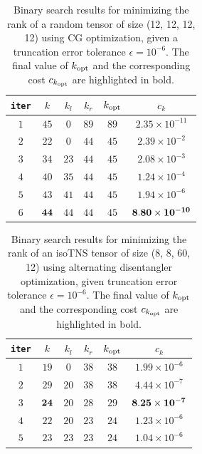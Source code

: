 \documentclass[pdflatex,sn-mathphys-num]{sn-jnl}
\begin{document}
\begin{table}
    \centering
    \begin{tabular}{cccccc}
    \toprule
     \texttt{iter} & $k$ & $k_l$ & $k_r$ & $k_{\rm opt}$ & $c_k$ \\
    \midrule
    $1$ & $45$ & $0$ & $89$ & $89$ & $2.35 \times 10^{-11}$ \\
    $2$ & $22$ & $0$ & $44$ & $45$ & $2.39 \times 10^{-2}$ \\
    $3$ & $34$ & $23$ & $44$ & $45$ & $2.08 \times 10^{-3}$\\
    $4$ & $40$ & $35$ & $44$ & $45$ & $1.24 \times 10^{-4}$ \\
    $5$ & $43$ & $41$ & $44$ & $45$ & $1.94 \times 10^{-6}$ \\
    $6$ & $\bf{44}$ & $44$ & $44$ & $45$ & 
    $\bf{8.80 \times 10^{-10}}$ \\
    \bottomrule
    \end{tabular}
\caption{Binary search results for minimizing the rank of a random tensor of size (12, 12, 12, 12) using CG optimization, given a truncation error tolerance $\epsilon = 10^{-6}$. The final value of $k_{\rm opt}$ and the corresponding cost $c_{k_{\rm opt}}$ are highlighted in bold.}
\label{table:binarysearch_randn}
\end{table}

\begin{table}
    \centering
    \begin{tabular}{cccccc}
    \toprule
     \texttt{iter} & $k$ & $k_l$ & $k_r$ & $k_{\rm opt}$ & $c_k$ \\
    \midrule
    $1$ & $19$ & $0$ & $38$ & $38$ & $1.99 \times 10^{-6}$ \\
    $2$ & $29$ & $20$ & $38$ & $38$ & $4.44 \times 10^{-7}$ \\
    $3$ & $\bf{24}$ & $20$ & $28$ & $29$ & $\bf{8.25 \times 10^{-7}}$ \\
    $4$ & $22$ & $20$ & $23$ & $24$ & $1.23 \times 10^{-6}$ \\
    $5$ & $23$ & $23$ & $23$ & $24$ & 
    $1.04 \times 10^{-6}$ \\
    \bottomrule
    \end{tabular}
\caption{Binary search results for minimizing the rank of an isoTNS tensor of size (8, 8, 60, 12) using alternating disentangler optimization, given truncation error tolerance $\epsilon = 10^{-6}$. The final value of $k_{\rm opt}$ and the corresponding cost $c_{k_{\rm opt}}$ are highlighted in bold.}
\label{table:binarysearch_tfi}
\end{table}
\end{document}

